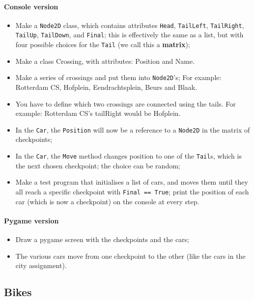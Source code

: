         \paragraph*{Console version}
        \begin{itemize}
            \item Make a \texttt{Node2D} class,
            which contains attributes
            \texttt{Head}, \texttt{TailLeft}, \texttt{TailRight}, \texttt{TailUp}, \texttt{TailDown}, and \texttt{Final};
            this is effectively the same as a list,
            but with four possible choices for the \texttt{Tail} (we call this a \textbf{matrix});
            \item Make a class Crossing, with attributes: Position and Name.
            \item Make a series of crossings and put them into \texttt{Node2D}'s; For example: Rotterdam CS, Hofplein, Eendrachtsplein, Beurs and Blaak.
            \item You have to define which two crossings are connected using the tails. For example: Rotterdam CS's tailRight would be Hofplein.
            \item In the \texttt{Car}, the \texttt{Position} will now be a reference to a \texttt{Node2D} in the matrix of checkpoints;
            \item In the \texttt{Car}, the \texttt{Move} method changes position to one of the \texttt{Tail}s, which is the next chosen checkpoint; the choice can be random;
            \item Make a test program that initialises a list of cars, and moves them until they all reach a specific checkpoint with \texttt{Final == True}; print the position of each car (which is now a checkpoint) on the console at every step.
        \end{itemize}

        \paragraph*{Pygame version}
        \begin{itemize}
            \item Draw a pygame screen with the checkpoints and the cars;
            \item The various cars move from one checkpoint to the other (like the cars in the city assignment).
        \end{itemize}

    \subsection{Bikes}
